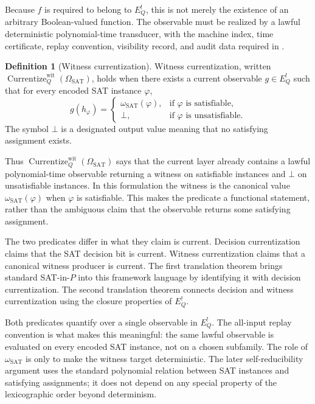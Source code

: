 \documentclass[11pt]{article}
\newcommand{\EQbang}{E^{!}_{Q}}
\newcommand{\OmegaSAT}{\Omega_{\mathrm{SAT}}}
\newcommand{\omegaSATsel}{\omega_{\mathrm{SAT}}}
\newcommand{\CurrentizeWit}{\operatorname{Currentize}^{\mathrm{wit}}_{Q}}
\theoremstyle{definition}
\newtheorem{definition}[theorem]{Definition}
\begin{document}
Because \(f\) is required to belong to \(\EQbang\), this is not merely
the existence of an arbitrary Boolean-valued function.  The observable
must be realized by a lawful deterministic polynomial-time transducer,
with the machine index, time certificate, replay convention,
visibility record, and audit data required in
.

\begin{definition}[Witness currentization]
\label{def:pvnp:currentize-wit}
Witness currentization, written \(\CurrentizeWit(\OmegaSAT)\), holds
when there exists a current observable \(g\in\EQbang\) such that for
every encoded SAT instance \(\varphi\),
\[
  g(h_{\varphi})=
  \begin{cases}
    \omegaSATsel(\varphi),
      & \text{if } \varphi \text{ is satisfiable},\\
    \bot,
      & \text{if } \varphi \text{ is unsatisfiable}.
  \end{cases}
\]
The symbol \(\bot\) is a designated output value meaning that no
satisfying assignment exists.
\end{definition}

Thus \(\CurrentizeWit(\OmegaSAT)\) says that the current layer already
contains a lawful polynomial-time observable returning a witness on
satisfiable instances and \(\bot\) on unsatisfiable instances.  In
this formulation the witness is the canonical value
\(\omegaSATsel(\varphi)\) when \(\varphi\) is satisfiable.  This makes
the predicate a functional statement, rather than the ambiguous claim
that the observable returns some satisfying assignment.

The two predicates differ in what they claim is current.  Decision
currentization claims that the SAT decision bit is current.  Witness
currentization claims that a canonical witness producer is current.
The first translation theorem brings standard SAT-in-\(P\) into this
framework language by identifying it with decision currentization.  The
second translation theorem connects decision and witness
currentization using the closure properties of \(\EQbang\).

Both predicates quantify over a single observable in \(\EQbang\).  The
all-input replay convention is what makes this meaningful: the same
lawful observable is evaluated on every encoded SAT instance, not on a
chosen subfamily.  The role of \(\omegaSATsel\) is only to make the
witness target deterministic.  The later self-reducibility argument
uses the standard polynomial relation between SAT instances and
satisfying assignments; it does not depend on any special property of
the lexicographic order beyond determinism.
 
\end{document}
